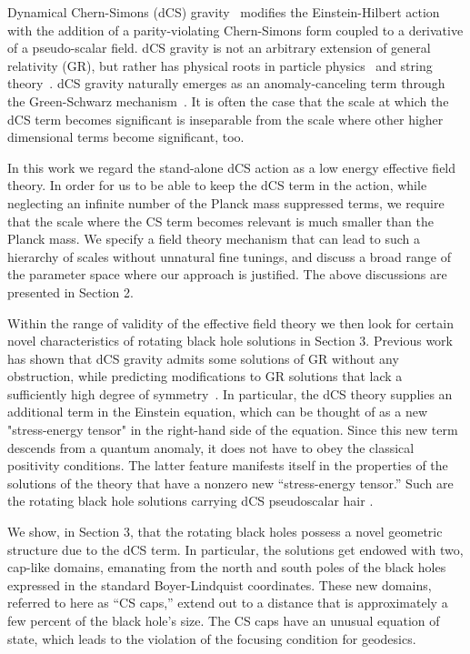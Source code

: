 \documentclass[prd,twocolumn,showpacs,superscriptaddress,nofootinbib]{revtex4-2}
\begin{document}
Dynamical Chern-Simons (dCS) gravity~\cite{Jackiw:2003pm, Alexander:2009tp} modifies the Einstein-Hilbert action with the addition of a parity-violating Chern-Simons form coupled to a derivative of a pseudo-scalar field.  
dCS gravity is not an arbitrary extension of general relativity (GR), but rather has physical roots in particle physics~\cite{ALVAREZGAUME1984269} and string theory~\cite{Polchinski:1998rr, PhysRevLett.96.081301, Alexander:2004xd}. dCS gravity naturally emerges as an anomaly-canceling term through the Green-Schwarz mechanism~\cite{Green:1987mn}.  It is often the case that  the scale  at which  the dCS term becomes 
significant is inseparable  from the scale where other higher dimensional terms become significant, too. 

In this work we regard the stand-alone dCS action as a low energy  effective field theory.   
In order  for us to be able to keep the dCS term in the action, while neglecting 
an infinite number of the Planck mass suppressed 
terms, we require that the  scale where the CS term becomes relevant is much smaller than the 
Planck mass. We specify  a  field theory mechanism that  can lead to such a hierarchy of scales without 
unnatural fine tunings, and discuss a broad range of the parameter space  where our approach is justified. 
The above discussions are presented in Section 2.


Within the range of validity of the effective field theory we then look for certain novel 
characteristics of rotating black hole solutions in Section 3.
Previous work has shown that dCS gravity admits some solutions of GR 
without any obstruction, while predicting modifications to GR solutions that lack a sufficiently high degree of symmetry~\cite{jackiw, CAMPBELL1991778, Guarrera:2007tu, Grumiller:2007rv}. 
In particular, the dCS theory supplies an additional term in the Einstein equation, which 
can be thought of as a new "stress-energy tensor" in the right-hand side of the equation. 
Since this new term descends from a quantum anomaly, it does not have to obey 
the classical positivity conditions. The latter feature manifests  itself in the properties 
of the solutions of the theory that  have a nonzero new ``stress-energy tensor.''  Such are the rotating 
black hole solutions carrying dCS pseudoscalar hair \cite{Yunes:2009hc,Yagi:2012ya,Maselli:2017kic}. 

We show, in Section 3,  that the rotating black holes possess   a novel geometric 
structure due to the dCS term. In particular, the solutions get endowed with two, 
cap-like domains,  emanating from the north and south poles of the black holes expressed 
in the standard Boyer-Lindquist coordinates. These new domains, referred to here as ``CS caps,'' extend  
out to a distance that  is approximately a few percent of the black hole's  size.  The CS caps have an unusual  
equation of state, which leads to the violation of the focusing condition for geodesics. 
\end{document}
